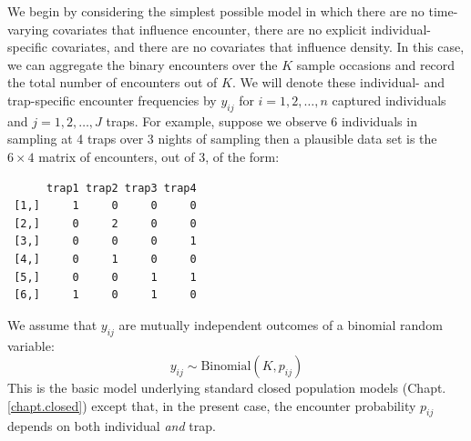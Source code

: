 We begin by considering the simplest possible model in which 
there are no time-varying covariates that
influence encounter, there are no explicit individual-specific
covariates, and there are no covariates that influence density. In
this case, we can aggregate the binary encounters over
the $K$ sample occasions and record the total number of encounters out
of $K$. We will denote these individual- and trap-specific encounter
frequencies by $y_{ij}$ for $i=1,2,\ldots,n$ captured
individuals and $j=1,2,\ldots,J$ traps.
For example, suppose we observe 6
individuals in sampling at 4 traps over 3 nights of sampling then a
plausible data set is the $6 \times 4$ matrix of encounters, out of 3,
of the form:
\begin{verbatim}
      trap1 trap2 trap3 trap4
 [1,]     1     0     0     0
 [2,]     0     2     0     0
 [3,]     0     0     0     1
 [4,]     0     1     0     0
 [5,]     0     0     1     1
 [6,]     1     0     1     0
\end{verbatim}
We assume that $y_{ij}$ are 
 mutually independent outcomes of a binomial random variable:
\begin{equation}
	y_{ij} \sim \mbox{Binomial}(K, p_{ij})
\label{scr0.eq.bin}
\end{equation}
This is the basic model underlying
 standard closed population models
(Chapt. \ref{chapt.closed}) except that, in the present case, the
encounter probability $p_{ij}$ depends on both individual {\it and}
trap. 



